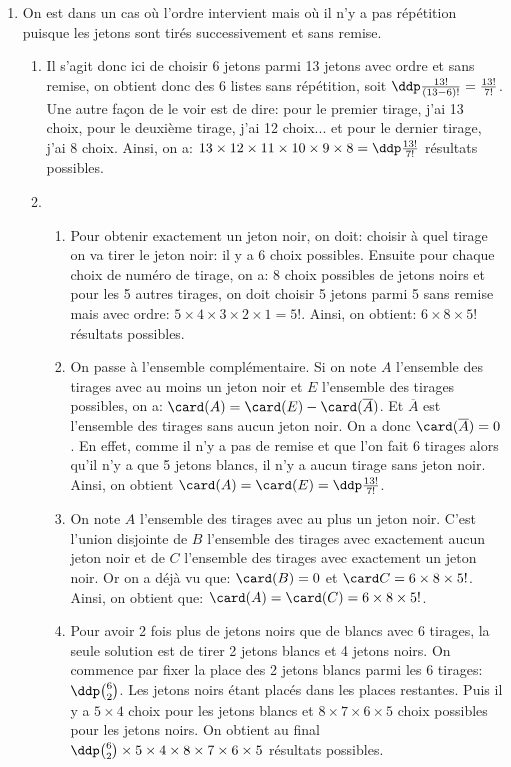 \documentclass[a4paper, 11pt,reqno]{article}
\begin{document}
\begin{correction}
\begin{enumerate}
\item On est dans un cas o\`u l'ordre intervient mais o\`u il n'y a pas r\'ep\'etition puisque les jetons sont tir\'es successivement et sans remise. 
\begin{enumerate}
\item Il s'agit donc ici de choisir 6 jetons parmi 13 jetons avec ordre et sans remise, on obtient donc des $6$ listes sans r\'ep\'etition, soit $\ddp \frac{13!}{(13-6)!} = \frac{13!}{7!}$. Une autre fa\c{c}on de le voir est de dire: pour le premier tirage, j'ai 13 choix, pour le deuxi\`eme tirage, j'ai 12 choix... et pour le dernier tirage, j'ai 8 choix. Ainsi, on a: $13\times 12\times 11\times 10\times 9\times 8=\ddp\frac{13!}{7!}$ r\'esultats possibles.
\item 
\begin{enumerate}
\item Pour obtenir exactement un jeton noir, on doit: choisir \`a quel tirage on va tirer le jeton noir: il y a 6 choix possibles. Ensuite pour chaque choix de num\'ero de tirage, on a: 8 choix possibles de jetons noirs et pour les 5 autres tirages, on doit choisir 5 jetons parmi 5 sans remise mais avec ordre: $5\times 4\times 3\times 2\times 1=5!$. Ainsi, on obtient: $6\times 8\times 5!$ r\'esultats possibles.
\item On passe \`a l'ensemble compl\'ementaire. Si on note $A$ l'ensemble des tirages avec au moins un jeton noir et $E$ l'ensemble des tirages possibles, on a: $\card (A)=\card (E)-\card (\overline{A})$. Et $\overline{A}$ est l'ensemble des tirages sans aucun jeton noir. On a donc $\card (\overline{A})=0$. En effet, comme il n'y a pas de remise et que l'on fait 6 tirages alors qu'il n'y a que 5 jetons blancs, il n'y a aucun tirage sans jeton noir. Ainsi, on obtient $\card (A)=\card (E)=\ddp\frac{13!}{7!}$.
\item On note $A$ l'ensemble des tirages avec au plus un jeton noir. C'est l'union disjointe de $B$ l'ensemble des tirages avec exactement aucun jeton noir et de $C$ l'ensemble des tirages avec exactement un jeton noir. Or on a d\'ej\`a vu que: $\card (B)=0$ et $\card C=6\times 8\times 5!$. Ainsi, on obtient que: $\card (A)=\card (C)= 6\times 8\times 5!$.
\item Pour avoir 2 fois plus de jetons noirs que de blancs avec 6 tirages, la seule solution est de tirer 2 jetons blancs et 4 jetons noirs. On commence par fixer la place des 2 jetons blancs parmi les 6 tirages: $\ddp \binom{6}{2}$. Les jetons noirs \'etant plac\'es dans les places restantes. Puis il y a $5\times 4$ choix pour les jetons blancs et $8\times 7\times 6\times 5$ choix possibles pour les jetons noirs. On obtient au final $\ddp \binom{6}{2}\times 5\times 4 \times 8\times 7\times 6\times 5$ r\'esultats possibles.

\end{enumerate}
\end{enumerate}
\end{enumerate}
\end{correction}
\end{document}
